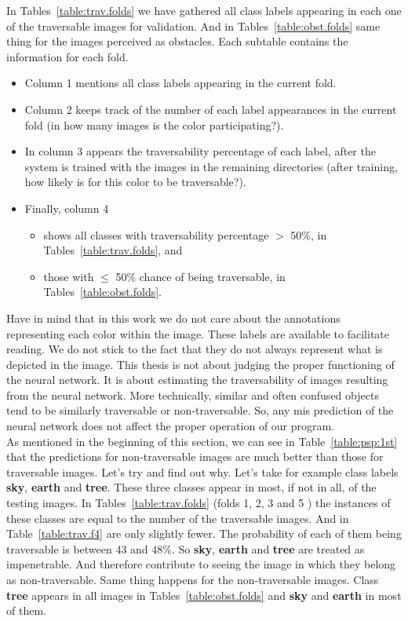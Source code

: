 \documentclass[12pt,a4paper,table,dvipsnames,tikz]{report}
\newcommand{\bl}[1]{{\hypersetup{linkcolor=blue}#1}}
\newcommand{\class}[1]{\textbf{\textcolor{#1}{#1}}} %
\begin{document}
	In Tables~\bl{\ref{table:trav.folds}} we have gathered all class labels appearing in each 
	one of the traversable images for validation. And in Tables~\bl{\ref{table:obst.folds}} 
	same thing for the images perceived as obstacles. Each subtable contains the information 
	for each fold. 
	\begin{itemize}
		\item Column 1 mentions all class labels appearing in the current fold.
		\item Column 2 keeps track of the number of each label appearances in the current fold 
		(in how many images is the color participating?).
		\item In column 3 appears the traversability percentage of each label, after the system 
		is trained with the images in the remaining directories (after training, how likely is for 
		this color to be traversable?).
		\item Finally, column 4 
		\begin{itemize}
			\item shows all classes with traversability percentage $>$ 50\%, in 
			Tables~\bl{\ref{table:trav.folds}}, and
			\item those with $\le$ 50\% chance of being traversable, in 
			Tables~\bl{\ref{table:obst.folds}}.
		\end{itemize}
	\end{itemize}
	
	Have in mind that in this work we do not care about the annotations representing each 
	color within the image. These labels are available to facilitate reading. We do not 
	stick to the fact that they do not always represent what is depicted in the image. This 
	thesis is not about judging the proper functioning of the neural network. It is about 
	estimating the traversability of images resulting from the neural network. More technically, 
	similar and often confused objects tend to be similarly traversable or non-traversable. 
	So, any mis prediction of the neural network does not affect the proper operation of 
	our program.
	\\
	
	As mentioned in the beginning of this section, we can see in Table~\bl{\ref{table:psp:1st}} 
	that the predictions for non-traversable images are much better than those for 
	traversable images. Let's try and find out why. Let's take for example class labels 
	\class{sky}, \class{earth} and \class{tree}. These three classes appear in most, if not in 
	all, of the testing images. In Tables~\bl{\ref{table:trav.folds}} (folds 1, 2, 3 and 5 ) the 
	instances of these classes are equal to the number of the traversable images. And in 
	Table~\bl{\ref{table:trav.f4}} are only slightly fewer. The probability of each of them 
	being traversable is between 43 and 48\%. So \class{sky}, \class{earth} and \class{tree} 
	are treated as impenetrable. And therefore contribute to seeing the image in which they 
	belong as non-traversable. Same thing happens for the non-traversable images. Class 
	\class{tree} appears in all images in Tables~\bl{\ref{table:obst.folds}} and \class{sky} and 
	\class{earth} in most of them.
	\\
	
\end{document}

